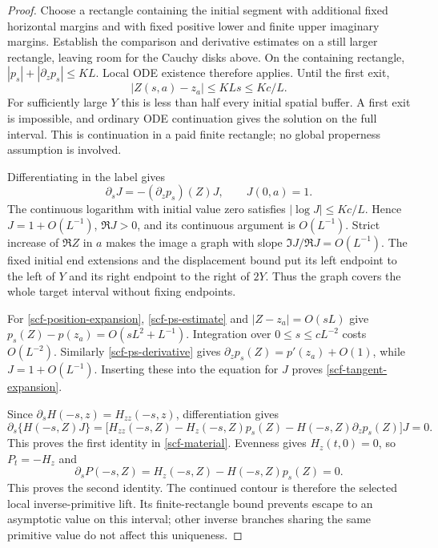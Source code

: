 \documentclass[11pt]{article}
\theoremstyle{remark}
\begin{document}
\begin{proof}
Choose a rectangle containing the initial segment with additional fixed
horizontal margins and with fixed positive lower and finite upper
imaginary margins.  Establish the comparison and derivative estimates
on a still larger rectangle, leaving room for the Cauchy disks above.
On the containing rectangle,
$|p_s|+|\partial_zp_s|\le KL$.  Local ODE existence therefore applies.
Until the first exit,
\[
 |Z(s,a)-z_a|\le KLs\le Kc/L.
\]
For sufficiently large $Y$ this is less than half every initial spatial
buffer.  A first exit is impossible, and ordinary ODE continuation gives
the solution on the full interval.  This is continuation in a paid
finite rectangle; no global properness assumption is involved.

Differentiating in the label gives
\[
 \partial_sJ=-(\partial_zp_s)(Z)J,\qquad J(0,a)=1.
\]
The continuous logarithm with initial value zero satisfies
$|\log J|\le Kc/L$.  Hence $J=1+O(L^{-1})$, $\Re J>0$, and its
continuous argument is $O(L^{-1})$.  Strict increase of $\Re Z$ in $a$
makes the image a graph with slope $\Im J/\Re J=O(L^{-1})$.
The fixed initial end extensions and the displacement bound put its left
endpoint to the left of $Y$ and its right endpoint to the right of $2Y$.
Thus the graph covers the whole target interval without fixing endpoints.

For \eqref{scf-position-expansion},
\eqref{scf-ps-estimate} and $|Z-z_a|=O(sL)$ give
$p_s(Z)-p(z_a)=O(sL^2+L^{-1})$.  Integration over
$0\le s\le cL^{-2}$ costs $O(L^{-2})$.
Similarly \eqref{scf-ps-derivative} gives
$\partial_zp_s(Z)=p'(z_a)+O(1)$, while $J=1+O(L^{-1})$.
Inserting these into the equation for $J$ proves
\eqref{scf-tangent-expansion}.

Since $\partial_sH(-s,z)=H_{zz}(-s,z)$, differentiation gives
\[
 \partial_s\{H(-s,Z)J\}
  =\bigl[H_{zz}(-s,Z)-H_z(-s,Z)p_s(Z)
       -H(-s,Z)\partial_zp_s(Z)\bigr]J=0.
\]
This proves the first identity in \eqref{scf-material}.
Evenness gives $H_z(t,0)=0$, so $P_t=-H_z$ and
\[
 \partial_s P(-s,Z)=H_z(-s,Z)-H(-s,Z)p_s(Z)=0.
\]
This proves the second identity.  The continued contour is therefore the
selected local inverse-primitive lift.  Its finite-rectangle bound
prevents escape to an asymptotic value on this interval; other inverse
branches sharing the same primitive value do not affect this uniqueness.


\end{proof}
\end{document}
